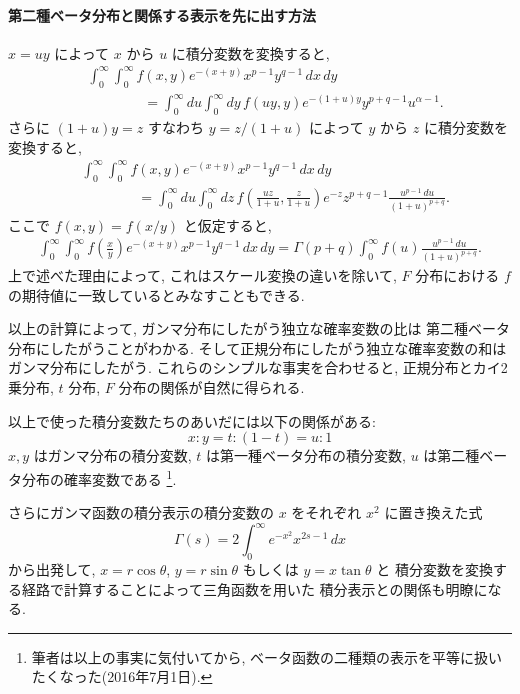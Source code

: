 \documentclass[12pt,twoside]{jarticle}
\theoremstyle{jplain}
\theoremstyle{jplain}
\theoremstyle{jplain}
\numberwithin{theorem}{section}
\numberwithin{equation}{section}
\numberwithin{figure}{section}
\numberwithin{table}{section}
\begin{document}
\paragraph{第二種ベータ分布と関係する表示を先に出す方法}
$x=uy$ によって $x$ から $u$ に積分変数を変換すると,
\begin{align*}
&
\int_0^\infty\int_0^\infty f(x,y)e^{-(x+y)}x^{p-1}y^{q-1}\,dx\,dy
\\ & \qquad\qquad
=\int_0^\infty du \int_0^\infty dy\, f(uy,y) e^{-(1+u)y}y^{p+q-1}u^{\alpha-1}.
\end{align*}
さらに $(1+u)y=z$ すなわち $y=z/(1+u)$ によって $y$ から $z$ に積分変数を変換すると,
\begin{align*}
&
\int_0^\infty\int_0^\infty f(x,y)e^{-(x+y)}x^{p-1}y^{q-1}\,dx\,dy
\\ & \qquad\qquad
=\int_0^\infty du \int_0^\infty dz\,
f\left(\frac{uz}{1+u},\frac{z}{1+u}\right) e^{-z}z^{p+q-1} \frac{u^{p-1}\,du}{(1+u)^{p+q}}.
\end{align*}
ここで $f(x,y)=f(x/y)$ と仮定すると,
\begin{align*}
\int_0^\infty\int_0^\infty f\left(\frac{x}{y}\right)e^{-(x+y)}x^{p-1}y^{q-1}\,dx\,dy
=\Gamma(p+q)\int_0^\infty f(u)\frac{u^{p-1}\,du}{(1+u)^{p+q}}.
\end{align*}
上で述べた理由によって, これはスケール変換の違いを除いて,
$F$ 分布における $f$ の期待値に一致しているとみなすこともできる.


以上の計算によって, ガンマ分布にしたがう独立な確率変数の比は
第二種ベータ分布にしたがうことがわかる.
そして正規分布にしたがう独立な確率変数の和はガンマ分布にしたがう.
これらのシンプルな事実を合わせると,
正規分布とカイ2乗分布, $t$ 分布, $F$ 分布の関係が自然に得られる.

以上で使った積分変数たちのあいだには以下の関係がある:
\[
x:y = t:(1-t) = u:1
\]
$x,y$ はガンマ分布の積分変数, $t$ は第一種ベータ分布の積分変数,
$u$ は第二種ベータ分布の確率変数である%
\footnote{筆者は以上の事実に気付いてから,
ベータ函数の二種類の表示を平等に扱いたくなった(2016年7月1日).}.

さらにガンマ函数の積分表示の積分変数の $x$ をそれぞれ $x^2$ に置き換えた式
\[
\Gamma(s)=2\int_{0}^\infty e^{-x^2}x^{2s-1}\,dx
\]
から出発して, $x=r\cos\theta$, $y=r\sin\theta$ もしくは $y=x\tan\theta$ と
積分変数を変換する経路で計算することによって三角函数を用いた
積分表示との関係も明瞭になる.
\end{document}
